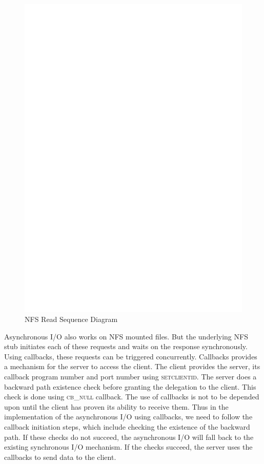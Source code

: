 \begin{figure}
\centering
\includegraphics[scale=0.9]{figures/ReadSequence.eps}
\caption{NFS Read Sequence Diagram}
\label{fig:NFSRead}
\end{figure}

Asynchronous I/O also works on NFS mounted files. But the underlying NFS stub initiates each of these requests and waits on the response synchronously. Using callbacks, these requests can be triggered concurrently. Callbacks provides a mechanism for the server to access the client. The client provides the server, its callback program number and port number using \textsc{setclientid}. The server does a backward path existence check before granting the delegation to the client. This check is done using \textsc{cb\_null} callback. The use of callbacks is not to be depended upon until the client has proven its ability to receive them. Thus in the implementation of the asynchronous I/O using callbacks, we need to follow the callback initiation steps, which include checking the existence of the backward path. If these checks do not succeed, the asynchronous I/O will fall back to the existing synchronous I/O mechanism. If the checks succeed, the server uses the callbacks to send data to the client.

